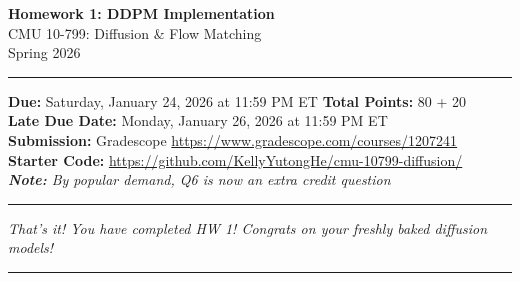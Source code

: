 \documentclass[11pt]{article}
\newif\ifshowanswers
\newcommand{\hwtitle}[2]{
    \begin{center}
        {\Large\bfseries\textcolor{cmured}{Homework #1: #2}}\\[0.5em]
        {\large CMU 10-799: Diffusion \& Flow Matching}\\[0.3em]
        {\normalsize Spring 2026}\\[0.5em]
        \ifshowanswers
            {\large\textcolor{answergreen}{\textbf{--- SOLUTIONS ---}}}\\[0.5em]
        \fi
        \rule{0.6\textwidth}{0.5pt}
    \end{center}
    \vspace{1em}
}
\newcommand{\hwinfo}[3]{
    \begin{tcolorbox}[
        colback=cmulight,
        colframe=cmugray,
        boxrule=0.5pt,
        arc=2pt,
        left=10pt,
        right=10pt,
        top=8pt,
        bottom=8pt
    ]
        \textbf{Due:} #1 \hfill \textbf{Total Points:} #2\\[0.3em]
        #3
    \end{tcolorbox}
    \vspace{1em}
}
\begin{document}
\hwtitle{1}{DDPM Implementation}

\hwinfo{Saturday, January 24, 2026 at 11:59 PM ET}{80 + 20}{
    \textbf{Late Due Date:} Monday, January 26, 2026 at 11:59 PM ET \\
    \textbf{Submission:} Gradescope \url{https://www.gradescope.com/courses/1207241} \\
    \textbf{Starter Code:} \url{https://github.com/KellyYutongHe/cmu-10799-diffusion/} \\
    \textcolor{cmured}{\textit{\textbf{Note:} By popular demand, Q6 is now an extra credit question}}
}










\vspace{2em}
\hrule
\vspace{1em}
\textit{\textcolor{cmured}{That's it! You have completed HW 1! Congrats on your freshly baked diffusion models!}}


\vspace{2em}
\noindent{\Large\bfseries\textcolor{cmured}{References}}
\vspace{0.4em}
\hrule
\vspace{0.6em}
\renewcommand{\bibsection}{}


\end{document}
